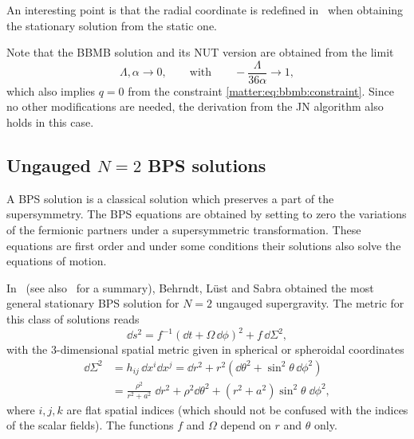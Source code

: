 An interesting point is that the radial coordinate is redefined in~\cite{Bardoux:2013:IntegrabilityConformallyCoupled} when obtaining the stationary solution from the static one.

Note that the BBMB solution and its NUT version are obtained from the limit
\begin{equation}
	\Lambda, \alpha \longrightarrow 0, \qquad
	\text{with} \qquad
	- \frac{\Lambda}{36 \alpha} \longrightarrow 1,
\end{equation} 
which also implies $q = 0$ from the constraint \eqref{matter:eq:bbmb:constraint}.
Since no other modifications are needed, the derivation from the JN algorithm also holds in this case.


\subsection{Ungauged \texorpdfstring{$N = 2$}{N = 2} BPS solutions}
\label{sec:examples:N=2-bps}


A BPS solution is a classical solution which preserves a part of the supersymmetry.
The BPS equations are obtained by setting to zero the variations of the fermionic partners under a supersymmetric transformation.
These equations are first order and under some conditions their solutions also solve the equations of motion.

In~\cite[sec.~3.1]{Behrndt:1998:StationarySolutionsN2} (see also~\cite[sec.~2.2]{Hristov:2010:BPSBlackHoles} for a summary), Behrndt, Lüst and Sabra obtained the most general stationary BPS solution for $N = 2$ ungauged supergravity.
The metric for this class of solutions reads
\begin{equation}
	\label{matter:metric:sugra:static-N=2}
	\dd s^2 = f^{-1} (\dd t + \Omega\, \dd\phi)^2 + f\, \dd \Sigma^2,
\end{equation} 
with the $3$-dimensional spatial metric given in spherical or spheroidal coordinates
\begin{subequations}
\label{matter:metric:flat-spatial}
\begin{align}
	\dd \Sigma^2 &= h_{ij}\, \dd x^i \dd x^j
		= \dd r^2 + r^2 (\dd\theta^2 + \sin^2 \theta\, \dd\phi^2) \\
		&= \frac{\rho^2}{r^2 + a^2}\; \dd r^2 + \rho^2 \dd\theta^2 + (r^2 + a^2) \sin^2 \theta\; \dd \phi^2,
\end{align}
\end{subequations}
where $i, j, k$ are flat spatial indices (which should not be confused with the indices of the scalar fields).
The functions $f$ and $\Omega$ depend on $r$ and $\theta$ only.

